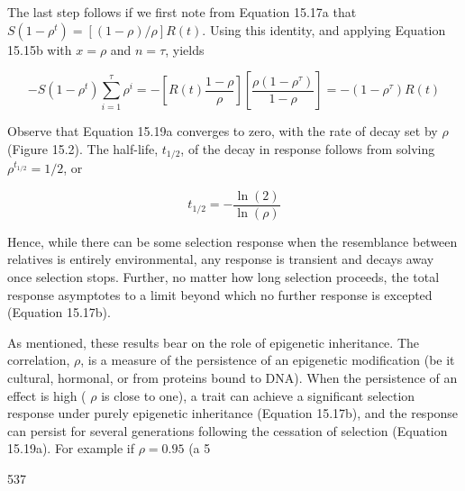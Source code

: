 \documentclass{article}
\begin{document}
The last step follows if we first note from Equation 15.17a that  $  S(1 - \rho^t) = [(1 - \rho)/\rho] R(t)  $. Using this identity, and applying Equation 15.15b with  $  x = \rho  $ and  $  n = \tau  $, yields

\begin{equation}
-S\left(1-\rho^{t}\right)\sum_{i=1}^{\tau}\rho^{i}=-\left[R(t)\frac{1-\rho}{\rho}\right]\left[\frac{\rho(1-\rho^{\tau})}{1-\rho}\right]=-(1-\rho^{\tau})R(t)
\tag{15.19b}
\label{eq:15_19b}
\end{equation}

Observe that Equation 15.19a converges to zero, with the rate of decay set by  $ \rho $ (Figure 15.2). The half-life,  $ t_{1/2} $, of the decay in response follows from solving  $ \rho^{t_{1/2}} = 1/2 $, or

\begin{equation}
t_{1/2}=-\frac{\ln(2)}{\ln(\rho)}
\tag{15.19c}
\label{eq:15_19c}
\end{equation}

Hence, while there can be some selection response when the resemblance between relatives is entirely environmental, any response is transient and decays away once selection stops. Further, no matter how long selection proceeds, the total response asymptotes to a limit beyond which no further response is excepted (Equation 15.17b).

As mentioned, these results bear on the role of epigenetic inheritance. The correlation,  $ \rho $, is a measure of the persistence of an epigenetic modification (be it cultural, hormonal, or from proteins bound to DNA). When the persistence of an effect is high ( $ \rho $ is close to one), a trait can achieve a significant selection response under purely epigenetic inheritance (Equation 15.17b), and the response can persist for several generations following the cessation of selection (Equation 15.19a). For example if  $ \rho = 0.95 $ (a 5%

537
\end{document}
